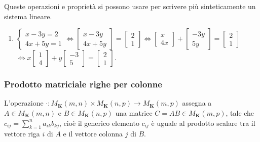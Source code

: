 \documentclass{article}
\begin{document}
Queste operazioni e propriet\`{a} si possono usare per scrivere pi\`{u}
sinteticamente un sistema lineare.

\begin{enumerate}
\item $\left\{ 
\begin{array}{c}
x-3y=2 \\ 
4x+5y=1%
\end{array}%
\right. \Longleftrightarrow \left[ 
\begin{array}{c}
x-3y \\ 
4x+5y%
\end{array}%
\right] =\left[ 
\begin{array}{c}
2 \\ 
1%
\end{array}%
\right] \Longleftrightarrow \left[ 
\begin{array}{c}
x \\ 
4x%
\end{array}%
\right] +\left[ 
\begin{array}{c}
-3y \\ 
5y%
\end{array}%
\right] =\left[ 
\begin{array}{c}
2 \\ 
1%
\end{array}%
\right] $ $\Longleftrightarrow x\left[ 
\begin{array}{c}
1 \\ 
4%
\end{array}%
\right] +y\left[ 
\begin{array}{c}
-3 \\ 
5%
\end{array}%
\right] =\left[ 
\begin{array}{c}
2 \\ 
1%
\end{array}%
\right] $.
\end{enumerate}

\subsubsection{Prodotto matriciale righe per colonne}

L'operazione $\cdot :M_{\mathbf{K}}\left( m,n\right) \times M_{\mathbf{K}%
}\left( n,p\right) \rightarrow M_{\mathbf{K}}\left( m,p\right) $ assegna a $%
A\in M_{\mathbf{K}}\left( m,n\right) $ e $B\in M_{\mathbf{K}}\left(
n,p\right) $ una matrice $C=AB\in M_{\mathbf{K}}\left( m,p\right) $, tale
che $c_{ij}=\sum_{k=1}^{n}a_{ik}b_{kj}$, cio\`{e} il generico elemento $%
c_{ij}$ \`{e} uguale al prodotto scalare tra il vettore riga $i$ di $A$ e il
vettore colonna $j$ di $B$.
\end{document}
